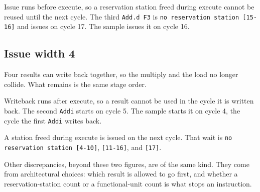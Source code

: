 \documentclass[11pt]{article}
\begin{document}
Issue runs before execute, so a reservation station freed during execute cannot be reused until the next cycle. The third \texttt{Add.d F3} is \texttt{no reservation station [15-16]} and issues on cycle 17. The sample issues it on cycle 16.

\subsection*{Issue width 4}

Four results can write back together, so the multiply and the load no longer collide. What remains is the same stage order.

Writeback runs after execute, so a result cannot be used in the cycle it is written back. The second \texttt{Addi} starts on cycle 5. The sample starts it on cycle 4, the cycle the first \texttt{Addi} writes back.

A station freed during execute is issued on the next cycle. That wait is \texttt{no reservation station [4-10]}, \texttt{[11-16]}, and \texttt{[17]}.

Other discrepancies, beyond these two figures, are of the same kind. They come from architectural choices: which result is allowed to go first, and whether a reservation-station count or a functional-unit count is what stops an instruction.
\end{document}
